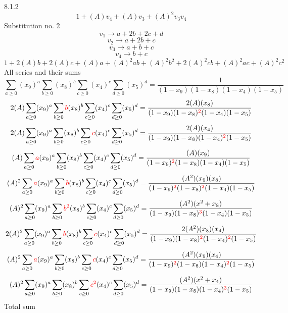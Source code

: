 \documentclass{article}
\begin{document}
8.1.2
\[1+(A)v_4+(A)v_3+(A)^2v_3v_4\]Substitution no. 2\[v_1\rightarrow{a+2b+2c+d}\]\[v_2\rightarrow{a+2b+c}\]\[v_3\rightarrow{a+b+c}\]\[v_4\rightarrow{b+c}\]\[1+2(A)b+2(A)c+(A)a+(A)^2ab+(A)^2b^{2}+2(A)^2cb+(A)^2ac+(A)^2c^{2}\]All series and their sums\[\sum_{a\geq{0}}(x_9)^{a}\sum_{b\geq{0}}(x_8)^{b}\sum_{c\geq{0}}(x_4)^{c}\sum_{d\geq{0}}(x_5)^{d}=\frac{1}{(1-x_9)(1-x_8)(1-x_4)(1-x_5)}\]\[2(A)\sum_{a\geq{0}}(x_9)^{a}\sum_{b\geq{0}}\textcolor{red}{b}(x_8)^{b}\sum_{c\geq{0}}(x_4)^{c}\sum_{d\geq{0}}(x_5)^{d}=\frac{2(A)(x_8)}{(1-x_9)(1-x_8)^{\textcolor{red}{2}}(1-x_4)(1-x_5)}\]\[2(A)\sum_{a\geq{0}}(x_9)^{a}\sum_{b\geq{0}}(x_8)^{b}\sum_{c\geq{0}}\textcolor{red}{c}(x_4)^{c}\sum_{d\geq{0}}(x_5)^{d}=\frac{2(A)(x_4)}{(1-x_9)(1-x_8)(1-x_4)^{\textcolor{red}{2}}(1-x_5)}\]\[(A)\sum_{a\geq{0}}\textcolor{red}{a}(x_9)^{a}\sum_{b\geq{0}}(x_8)^{b}\sum_{c\geq{0}}(x_4)^{c}\sum_{d\geq{0}}(x_5)^{d}=\frac{(A)(x_9)}{(1-x_9)^{\textcolor{red}{2}}(1-x_8)(1-x_4)(1-x_5)}\]\[(A)^{2}\sum_{a\geq{0}}\textcolor{red}{a}(x_9)^{a}\sum_{b\geq{0}}\textcolor{red}{b}(x_8)^{b}\sum_{c\geq{0}}(x_4)^{c}\sum_{d\geq{0}}(x_5)^{d}=\frac{(A^{2})(x_9)(x_8)}{(1-x_9)^{\textcolor{red}{2}}(1-x_8)^{\textcolor{red}{2}}(1-x_4)(1-x_5)}\]\[(A)^{2}\sum_{a\geq{0}}(x_9)^{a}\sum_{b\geq{0}}\textcolor{red}{b^{2}}(x_8)^{b}\sum_{c\geq{0}}(x_4)^{c}\sum_{d\geq{0}}(x_5)^{d}=\frac{(A^{2})(x^{2}+x_8)}{(1-x_9)(1-x_8)^{\textcolor{red}{3}}(1-x_4)(1-x_5)}\]\[2(A)^{2}\sum_{a\geq{0}}(x_9)^{a}\sum_{b\geq{0}}\textcolor{red}{b}(x_8)^{b}\sum_{c\geq{0}}\textcolor{red}{c}(x_4)^{c}\sum_{d\geq{0}}(x_5)^{d}=\frac{2(A^{2})(x_8)(x_4)}{(1-x_9)(1-x_8)^{\textcolor{red}{2}}(1-x_4)^{\textcolor{red}{2}}(1-x_5)}\]\[(A)^{2}\sum_{a\geq{0}}\textcolor{red}{a}(x_9)^{a}\sum_{b\geq{0}}(x_8)^{b}\sum_{c\geq{0}}\textcolor{red}{c}(x_4)^{c}\sum_{d\geq{0}}(x_5)^{d}=\frac{(A^{2})(x_9)(x_4)}{(1-x_9)^{\textcolor{red}{2}}(1-x_8)(1-x_4)^{\textcolor{red}{2}}(1-x_5)}\]\[(A)^{2}\sum_{a\geq{0}}(x_9)^{a}\sum_{b\geq{0}}(x_8)^{b}\sum_{c\geq{0}}\textcolor{red}{c^{2}}(x_4)^{c}\sum_{d\geq{0}}(x_5)^{d}=\frac{(A^{2})(x^{2}+x_4)}{(1-x_9)(1-x_8)(1-x_4)^{\textcolor{red}{3}}(1-x_5)}\]
Total sum
\end{document}
